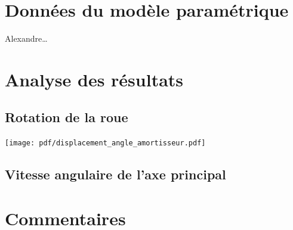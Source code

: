 \documentclass{article}
\begin{document}
\newpage
\tableofcontents

\newpage
\section{Données du modèle paramétrique}

Alexandre\dots

\section{Analyse des résultats}
\subsection{Rotation de la roue}
\texttt{[image: pdf/displacement\_angle\_amortisseur.pdf]}
\subsection{Vitesse angulaire de l'axe principal}

\section{Commentaires}
\end{document}
